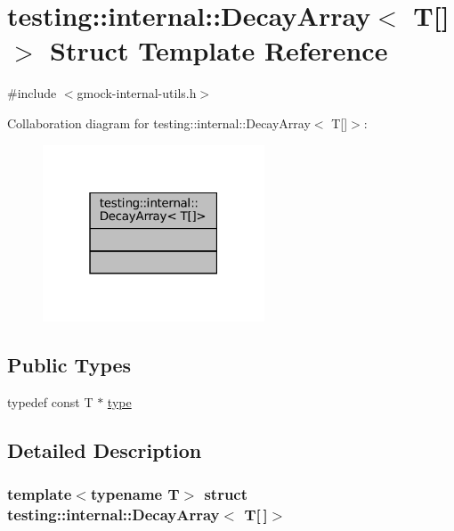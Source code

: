 \hypertarget{structtesting_1_1internal_1_1DecayArray_3_01T[]_4}{}\section{testing\+:\+:internal\+:\+:Decay\+Array$<$ T\mbox{[}\mbox{]}$>$ Struct Template Reference}
\label{structtesting_1_1internal_1_1DecayArray_3_01T[]_4}


{\ttfamily \#include $<$gmock-\/internal-\/utils.\+h$>$}



Collaboration diagram for testing\+:\+:internal\+:\+:Decay\+Array$<$ T\mbox{[}\mbox{]}$>$\+:
\nopagebreak
\begin{figure}[H]
\begin{center}
\leavevmode
\includegraphics[width=187pt]{structtesting_1_1internal_1_1DecayArray_3_01T[]_4__coll__graph}
\end{center}
\end{figure}
\subsection*{Public Types}
\begin{DoxyCompactItemize}
\item 
typedef const T $\ast$ \hyperlink{structtesting_1_1internal_1_1DecayArray_3_01T[]_4_a1820b673d104b3a985faaef8db5d77d2}{type}
\end{DoxyCompactItemize}


\subsection{Detailed Description}
\subsubsection*{template$<$typename T$>$\newline
struct testing\+::internal\+::\+Decay\+Array$<$ T\mbox{[}$\,$\mbox{]}$>$}



